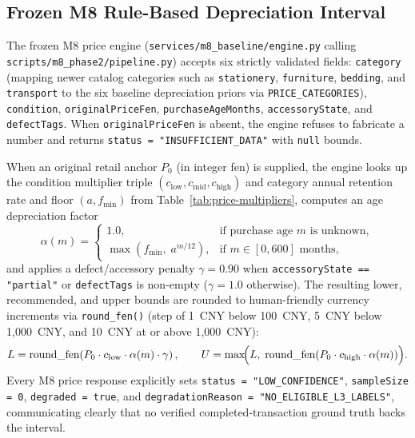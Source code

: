 \subsection{Frozen M8 Rule-Based Depreciation Interval}

The frozen M8 price engine (\texttt{services/\allowbreak m8\_baseline/\allowbreak engine.py} calling \texttt{scripts/\allowbreak m8\_phase2/\allowbreak pipeline.py}) accepts six strictly validated fields: \texttt{category} (mapping newer catalog categories such as \texttt{stationery}, \texttt{furniture}, \texttt{bedding}, and \texttt{transport} to the six baseline depreciation priors via \texttt{PRICE\_CATEGORIES}), \texttt{condition}, \texttt{originalPriceFen}, \texttt{purchaseAgeMonths}, \texttt{accessoryState}, and \texttt{defectTags}. When \texttt{originalPriceFen} is absent, the engine refuses to fabricate a number and returns \texttt{status = "INSUFFICIENT\_DATA"} with \texttt{null} bounds.

When an original retail anchor $P_0$ (in integer fen) is supplied, the engine looks up the condition multiplier triple $(c_{\text{low}}, c_{\text{mid}}, c_{\text{high}})$ and category annual retention rate and floor $(a, f_{\min})$ from Table~\ref{tab:price-multipliers}, computes an age depreciation factor
\begin{equation}
  \alpha(m) =
  \begin{cases}
    1.0, & \text{if purchase age } m \text{ is unknown}, \\[4pt]
    \max\!\left(f_{\min},\; a^{m / 12}\right), & \text{if } m \in [0, 600] \text{ months},
  \end{cases}
  \label{eq:age-factor}
\end{equation}
and applies a defect/accessory penalty $\gamma = 0.90$ when \texttt{accessoryState == "partial"} or \texttt{defectTags} is non-empty ($\gamma = 1.0$ otherwise). The resulting lower, recommended, and upper bounds are rounded to human-friendly currency increments via \texttt{round\_fen()} (step of 1~CNY below 100~CNY, 5~CNY below 1,000~CNY, and 10~CNY at or above 1,000~CNY):
\begin{equation}
  L = \text{round\_fen}\!\left(P_0 \cdot c_{\text{low}} \cdot \alpha(m) \cdot \gamma\right), \qquad
  U = \max\!\Bigl(L,\; \text{round\_fen}\!\left(P_0 \cdot c_{\text{high}} \cdot \alpha(m)\right)\Bigr).
  \label{eq:price-bounds}
\end{equation}
Every M8 price response explicitly sets \texttt{status = "LOW\_CONFIDENCE"}, \texttt{sampleSize = 0}, \texttt{degraded = true}, and \texttt{degradationReason = "NO\_ELIGIBLE\_L3\_LABELS"}, communicating clearly that no verified completed-transaction ground truth backs the interval.

